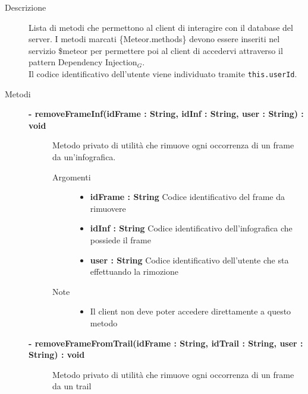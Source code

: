\begin{description}
\item[Descrizione] \hfill
	Lista di metodi che permettono al client di interagire con il database del server. I metodi marcati \{Meteor.methods\} devono essere inseriti nel servizio \$meteor per permettere poi al client di accedervi attraverso il pattern Dependency Injection$_G$.\\
	Il codice identificativo dell'utente viene individuato tramite \texttt{this.userId}.






\item[Metodi] \hfill

	\begin{description}
		\item[\textbf{\color{blue}- removeFrameInf(idFrame : String, idInf : String, user : String) : void			}] \hfill
			Metodo privato di utilità che rimuove ogni occorrenza di un frame da un'infografica.
			
		\begin{description}
			\item[Argomenti] \hfill
				\begin{itemize}
				
					\item \textbf{idFrame : String			} \hfill
					Codice identificativo del frame da rimuovere
					\item \textbf{idInf : String		} \hfill
					Codice identificativo dell'infografica che possiede il frame
					\item \textbf{user : String			} \hfill
					Codice identificativo dell'utente che sta effettuando la rimozione
					
				\end{itemize}
			\item[Note] \hfill
			\begin{itemize}
					\item Il client non deve poter accedere direttamente a questo metodo
				\end{itemize}
		\end{description}
	\end{description}
	
	\begin{description}
		\item[\textbf{\color{blue}- removeFrameFromTrail(idFrame : String, idTrail : String, user :  String)	: void		}] \hfill
			Metodo privato di utilità che rimuove ogni occorrenza di un frame da un trail
			

\end{description}
\end{description}
